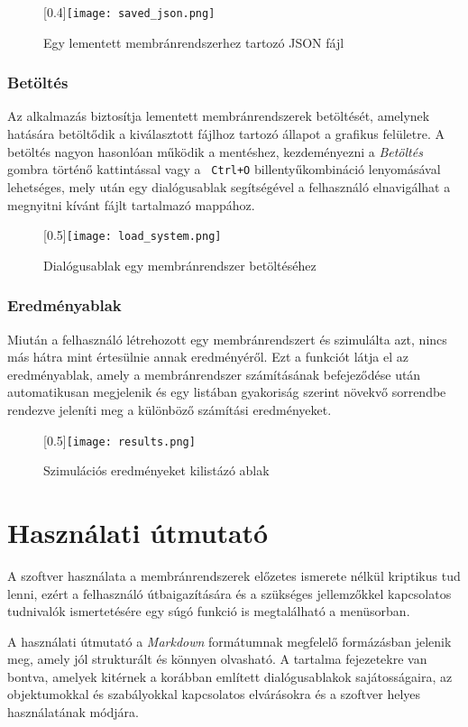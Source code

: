 \begin{figure}[H]
	\centering
	\scalebox{0.4}[0.4]{\texttt{[image: saved\_json.png]}}
	\caption{Egy lementett membránrendszerhez tartozó JSON fájl  \protect\footnotemark}
	\label{fig:saved_json}
\end{figure}


\subsubsection{Betöltés}

Az alkalmazás biztosítja lementett membránrendszerek betöltését, amelynek hatására betöltődik a kiválasztott fájlhoz tartozó állapot a grafikus felületre.
A betöltés nagyon hasonlóan működik a mentéshez, kezdeményezni a \textit{Betöltés} gombra történő kattintással vagy a \verb| Ctrl+O| billentyűkombináció lenyomásával lehetséges, mely után egy dialógusablak segítségével a felhasználó elnavigálhat a megnyitni kívánt fájlt tartalmazó mappához.

\begin{figure}[H]
	\centering
	\scalebox{0.5}[0.5]{\texttt{[image: load\_system.png]}}
	\caption{Dialógusablak egy membránrendszer betöltéséhez}
	\label{fig:load_system}
\end{figure}

\subsubsection{Eredményablak}

Miután a felhasználó létrehozott egy membránrendszert és szimulálta azt, nincs más hátra mint értesülnie annak eredményéről.  Ezt a funkciót látja el az eredményablak, amely a membránrendszer számításának befejeződése után automatikusan megjelenik és egy listában gyakoriság szerint növekvő sorrendbe rendezve jeleníti meg a különböző számítási eredményeket.

\begin{figure}[H]
	\centering
	\scalebox{0.5}[0.5]{\texttt{[image: results.png]}}
	\caption{Szimulációs eredményeket kilistázó ablak}
	\label{fig:load_system}
\end{figure}

\section{Használati útmutató}\label{help}

A szoftver használata a membránrendszerek előzetes ismerete nélkül kriptikus tud lenni, ezért a felhasználó útbaigazítására és a szükséges jellemzőkkel kapcsolatos tudnivalók ismertetésére egy súgó funkció is megtalálható a menüsorban.

A használati útmutató a \textit{Markdown} formátumnak megfelelő formázásban jelenik meg, amely jól strukturált és könnyen olvasható. A tartalma fejezetekre van bontva, amelyek kitérnek a korábban említett dialógusablakok sajátosságaira, az objektumokkal és szabályokkal kapcsolatos elvárásokra és a szoftver helyes használatának módjára.